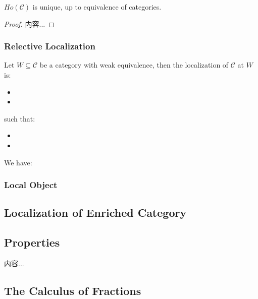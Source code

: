 \documentclass[total.tex]{subfiles}
\begin{document}
				\begin{proposition}
					$Ho(\mathcal{C})$ is unique, up to equivalence of categories.
				\end{proposition}
				\begin{proof}
					内容...
				\end{proof}
			\subsubsection{Relective Localization}
			\begin{Def}
				Let $W\subseteq \mathcal{C}$ be a category with weak equivalence, then the localization of $\mathcal{C}$ at $W$ is:
				\begin{itemize}
					\item 
					\item 
				\end{itemize}
				
				such that:
				\begin{itemize}
					\item 
					\item 
				\end{itemize}
			\end{Def}
			
			We have:
			\begin{center}
			\end{center}
			
			\subsubsection{Local Object}
			\subsection{Localization of Enriched Category}
			
			\subsection{Properties}
				\begin{proposition}
					内容...
				\end{proposition}
				
			\subsection{The Calculus of Fractions}
\end{document}
